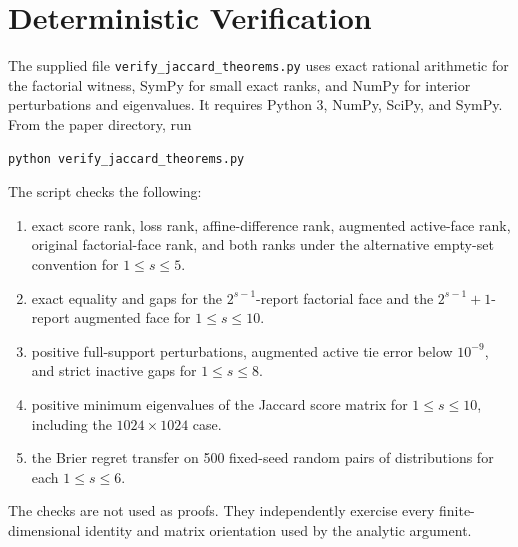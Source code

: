\documentclass[twoside]{article}
\newcommand{\1}{\mathbf 1}
\begin{document}
\section{Deterministic Verification}

The supplied file \texttt{verify\_jaccard\_theorems.py} uses exact rational arithmetic for the factorial witness, SymPy for small exact ranks, and NumPy for interior perturbations and eigenvalues. It requires Python 3, NumPy, SciPy, and SymPy. From the paper directory, run
\begin{verbatim}
python verify_jaccard_theorems.py
\end{verbatim}
The script checks the following:
\begin{enumerate}
\item exact score rank, loss rank, affine-difference rank, augmented active-face rank, original factorial-face rank, and both ranks under the alternative empty-set convention for $1\leq s\leq5$.
\item exact equality and gaps for the $2^{s-1}$-report factorial face and the $2^{s-1}+1$-report augmented face for $1\leq s\leq10$.
\item positive full-support perturbations, augmented active tie error below $10^{-9}$, and strict inactive gaps for $1\leq s\leq8$.
\item positive minimum eigenvalues of the Jaccard score matrix for $1\leq s\leq10$, including the $1024\times1024$ case.
\item the Brier regret transfer on 500 fixed-seed random pairs of distributions for each $1\leq s\leq6$.
\end{enumerate}
The checks are not used as proofs. They independently exercise every finite-dimensional identity and matrix orientation used by the analytic argument.


\end{document}
